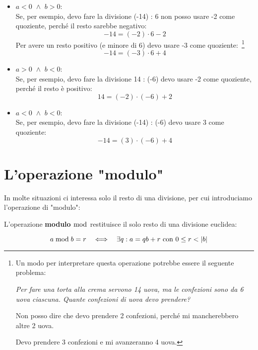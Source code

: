 \begin{itemize}
    \item $a < 0 \,\,\land\,\, b > 0$: \\
    Se, per esempio, devo fare la divisione (-14) : 6 non posso usare -2 come quoziente, perché il resto sarebbe negativo:
    \begin{equation*}
        -14 = (-2) \cdot 6 - 2
    \end{equation*}
    Per avere un resto positivo (e minore di 6) devo usare -3 come quoziente:~\footnote{
    Un modo per interpretare questa operazione potrebbe essere il seguente problema:
    
    \emph{Per fare una torta alla crema servono 14 uova, ma le confezioni sono da 6 uova ciascuna. Quante confezioni di uova devo prendere?} 
    
    Non posso dire che devo prendere 2 confezioni, perché mi mancherebbero altre 2 uova. 
    
    Devo prendere 3 confezioni e mi avanzeranno 4 uova.}
    \begin{equation*}
        -14 = (-3) \cdot 6 + 4
    \end{equation*}

    \item $a > 0 \,\,\land\,\, b < 0$: \\
    Se, per esempio, devo fare la divisione 14 : (-6) devo usare -2 come quoziente, perché il resto è positivo:
    \begin{equation*}
        14 = (-2) \cdot (-6) + 2
    \end{equation*}

    \item $a < 0 \,\,\land\,\, b < 0$: \\
    Se, per esempio, devo fare la divisione (-14) : (-6) devo usare 3 come quoziente:
    \begin{equation*}
        -14 = (3) \cdot (-6) + 4
    \end{equation*}
\end{itemize}

\section{L'operazione "modulo"}

In molte situazioni ci interessa solo il resto di una divisione, per cui introduciamo l'operazione di "modulo":

\begin{mdframed}
\begin{definizione}
    L'operazione \textbf{modulo} $\bmod$ restituisce il solo resto di una divisione euclidea:

    \begin{equation}
        a \bmod b = r  \quad\Longleftrightarrow\quad  \exists q : a = qb + r \text{ con } 0 \le r <  \lvert b \rvert 
    \end{equation}
\end{definizione}
\end{mdframed}

